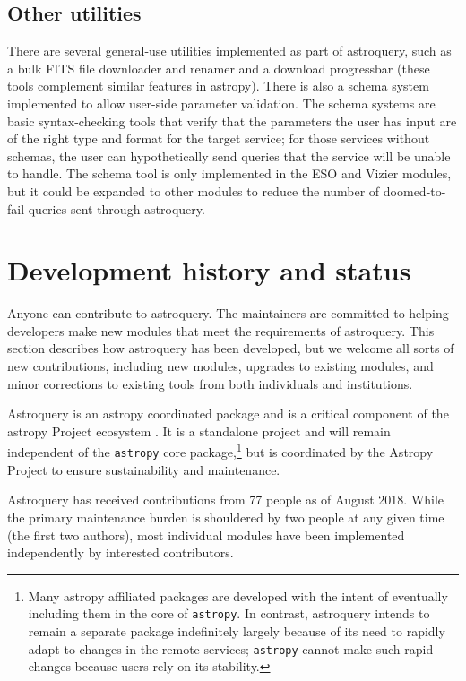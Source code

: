 \documentclass[twocolumn]{aastex62}
\newcommand{\package}[1]{\texttt{#1}\xspace}
\newcommand{\astropypkg}{\package{astropy}}
\begin{document}
\subsection{Other utilities}
There are several general-use utilities implemented as part of astroquery, such
as a bulk FITS file downloader and renamer and a download progressbar (these
tools complement similar features in astropy).  There
is also a schema system implemented to allow user-side parameter validation.
The schema systems are basic syntax-checking tools that verify that the parameters
the user has input are of the right type and format for the target service;
for those services without schemas, the user can hypothetically send queries
that the service will be unable to handle.
The schema tool is only implemented in the ESO and Vizier modules, but it could
be expanded to other modules to reduce the number of doomed-to-fail queries
sent through astroquery.

\section{Development history and status}
\label{sec:development}
Anyone can contribute to astroquery.  The maintainers are committed to helping
developers make new modules that meet the requirements of astroquery.  This
section describes how astroquery has been developed, but we welcome all sorts
of new contributions, including new modules, upgrades to existing modules, and
minor corrections to existing tools from both individuals and institutions.

Astroquery is an astropy coordinated package \citep{APE15} and is a critical
component of the astropy Project ecosystem \citep{Astropy-Collaboration2018}.
It is a standalone project and will remain independent of the \astropypkg core
package,\footnote{Many astropy affiliated packages are developed with the
intent of eventually including them in the core of \astropypkg.  In contrast,
astroquery intends to remain a separate package indefinitely largely because
of its need to rapidly adapt to changes in the remote services; \astropypkg
cannot make such rapid changes because users rely on its stability.} but is
coordinated by the Astropy Project to ensure sustainability and maintenance.

Astroquery has received contributions from 77 people as of August 2018.  While
the primary maintenance burden is shouldered by two people at any given time
(the first two authors), most individual modules have been implemented
independently by interested contributors.
\end{document}
